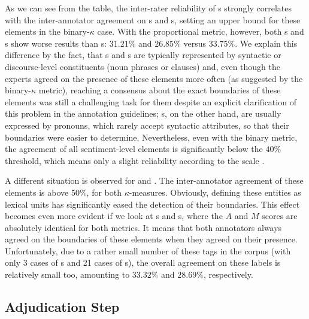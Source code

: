 As we can see from the table, the inter-rater reliability of
s strongly correlates with the inter-annotator
agreement on s and s, setting an
upper bound for these elements in the binary-$\kappa$ case.  With the
proportional metric, however, both s and
s show worse results than s:
$31.21\%$ and $26.85\%$ versus $33.75\%$.  We explain this difference
by the fact, that s and s are
typically represented by syntactic or discourse-level constituents
(noun phrases or clauses) and, even though the experts agreed on the
presence of these elements more often (as suggested by the
binary-$\kappa$ metric), reaching a consensus about the exact
boundaries of these elements was still a challenging task for them
despite an explicit clarification of this problem in the annotation
guidelines; s, on the other hand, are usually
expressed by pronouns, which rarely accept syntactic attributes, so
that their boundaries were easier to determine.  Nevertheless, even
with the binary metric, the agreement of all sentiment-level elements
is significantly below the $40\%$ threshold, which means only a slight
reliability according to the \citeauthor{Landis:77} scale
\cite{Landis:77}.

A different situation is observed for  and
.  The inter-annotator agreement of these
elements is above 50\%, for both $\kappa$-measures.  Obviously,
defining these entities as lexical units has significantly eased the
detection of their boundaries.  This effect becomes even more evident
if we look at s and s, where
the $A$ and $M$ scores are absolutely identical for both metrics.  It
means that both annotators always agreed on the boundaries of these
elements when they agreed on their presence.  Unfortunately, due to a
rather small number of these tags in the corpus (with only 3 cases of
s and 21 cases of s), the
overall agreement on these labels is relatively small too, amounting
to $33.32\%$ and $28.69\%$, respectively.

\subsection{Adjudication Step}\label{subsec:eval-adjudication-step}

